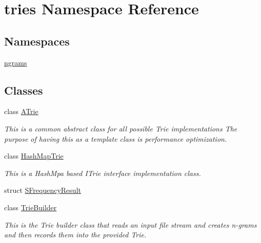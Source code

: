 \hypertarget{namespacetries}{}\section{tries Namespace Reference}
\label{namespacetries}
\subsection*{Namespaces}
\begin{DoxyCompactItemize}
\item 
 \hyperlink{namespacetries_1_1ngrams}{ngrams}
\end{DoxyCompactItemize}
\subsection*{Classes}
\begin{DoxyCompactItemize}
\item 
class \hyperlink{classtries_1_1_a_trie}{A\+Trie}
\begin{DoxyCompactList}\small\item\em This is a common abstract class for all possible Trie implementations The purpose of having this as a template class is performance optimization. \end{DoxyCompactList}\item 
class \hyperlink{classtries_1_1_hash_map_trie}{Hash\+Map\+Trie}
\begin{DoxyCompactList}\small\item\em This is a Hash\+Mpa based I\+Trie interface implementation class. \end{DoxyCompactList}\item 
struct \hyperlink{structtries_1_1_s_frequency_result}{S\+Frequency\+Result}
\item 
class \hyperlink{classtries_1_1_trie_builder}{Trie\+Builder}
\begin{DoxyCompactList}\small\item\em This is the Trie builder class that reads an input file stream and creates n-\/grams and then records them into the provided Trie. \end{DoxyCompactList}\end{DoxyCompactItemize}
